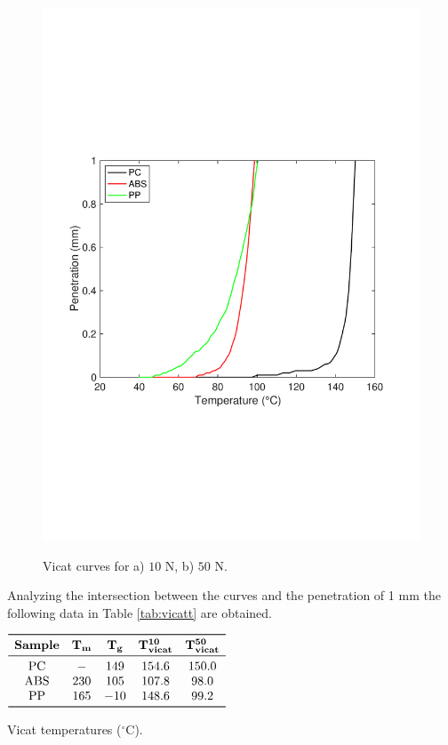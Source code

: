 \documentclass[a4paper, 11pt]{article}
\begin{document}
\begin{figure}[htp]
	{\includegraphics[scale=0.36]{vicat50}}\qquad
	\captionsetup{justification=centering}
	\caption{Vicat curves for a) $10$ N, b) $50$ N.}
	\label{fig:vicat}
\end{figure}

Analyzing the intersection between the curves and the penetration of 1 mm the following data in Table \ref{tab:vicatt} are obtained.

\begin{table}[htp]
	\centering
	$
	\begin{array}{ccccc}
	\toprule
	\textbf{Sample} & \mathbf{T_{m}} & \mathbf{T_{g}} & \mathbf{T_{vicat}^\textbf{10}} & \mathbf{T_{vicat}^\textbf{50}} \\
	\midrule
	\text{PC} & - & 149 & 154.6 & 150.0\\
	\text{ABS} & 230 & 105 & 107.8 & 98.0\\
	\text{PP} & 165 & -10 & 148.6 & 99.2\\
	\bottomrule
	\end{array}
	$
	\caption{Vicat temperatures ($^\circ$C).}
	\label{tab:vicatt}
\end{table}
\end{document}
